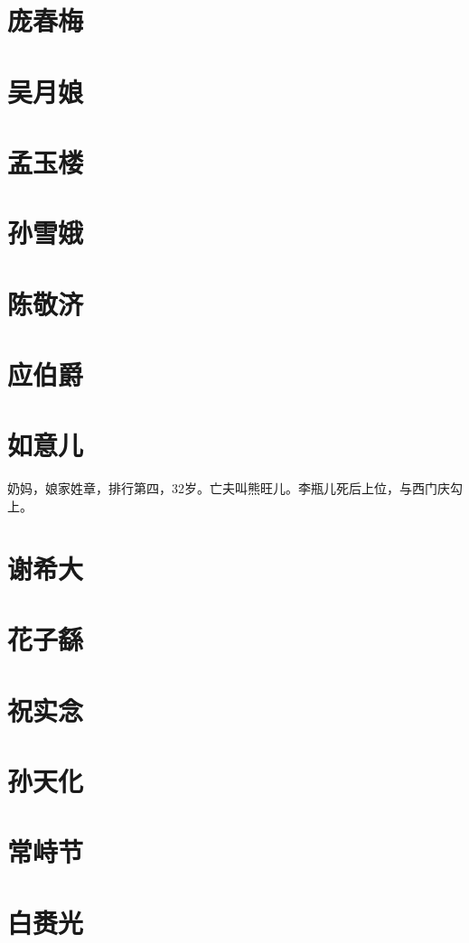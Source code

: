 \section{庞春梅}

\section{吴月娘}

\section{孟玉楼}

\section{孙雪娥}

\section{陈敬济}

\section{应伯爵}

\section{如意儿}
奶妈，娘家姓章，排行第四，32岁。亡夫叫熊旺儿。李瓶儿死后上位，与西门庆勾上。

\section{谢希大}

\section{花子繇}

\section{祝实念}

\section{孙天化}

\section{常峙节}

\section{白赉光}